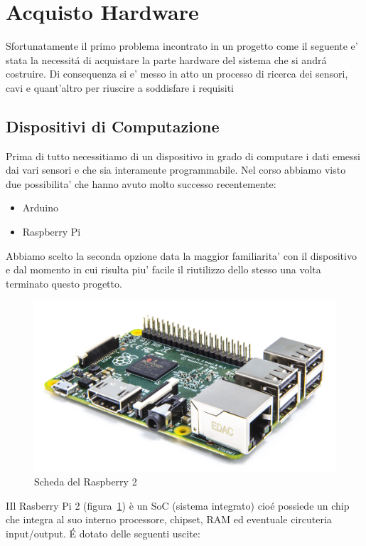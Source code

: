 \section{Acquisto Hardware}

Sfortunatamente il primo problema incontrato in un progetto come il seguente e' stata la necessit\'a di acquistare la parte hardware del sistema che si andr\' a costruire. Di consequenza si e' messo in atto un processo di ricerca dei sensori, cavi e quant'altro per riuscire a soddisfare i requisiti

\subsection{Dispositivi di Computazione}

Prima di tutto necessitiamo di un dispositivo in grado di computare i dati emessi dai vari sensori e che sia interamente programmabile. Nel corso abbiamo visto due possibilita' che hanno avuto molto successo recentemente:

\begin{itemize}
  \item Arduino
  \item Raspberry Pi
\end{itemize}

Abbiamo scelto la seconda opzione data la maggior familiarita' con il dispositivo e dal momento in cui risulta piu' facile il riutilizzo dello stesso una volta terminato questo progetto.

\begin{figure}
	\centering
	\includegraphics[width=0.7\linewidth]{Figures/Sensors&Rasp/Pi2}
	\caption[raspberry]{Scheda del Raspberry 2}
	\label{fig:Pi2}
\end{figure}



IIl Rasberry Pi 2 (figura~\ref{fig:Pi2}) è un SoC (sistema integrato) cio\'e possiede un chip che integra al suo interno processore, chipset, RAM ed eventuale circuteria input/output. \'E dotato delle seguenti uscite:

